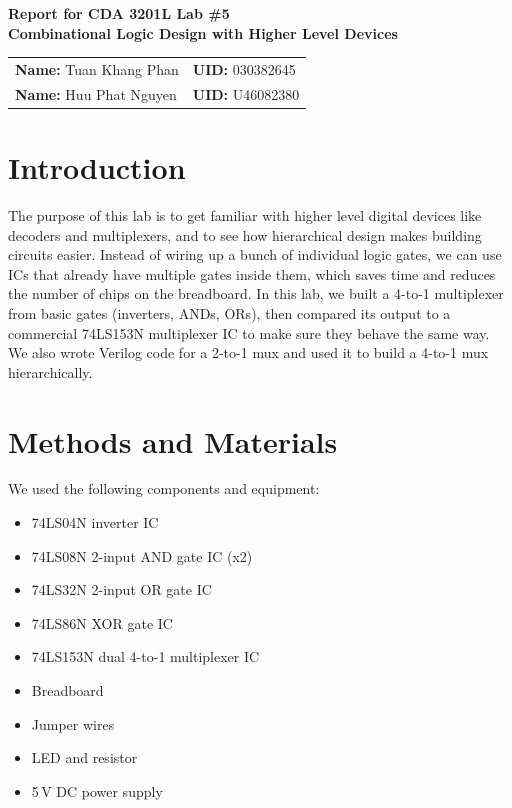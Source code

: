 \documentclass[12pt, letterpaper]{article}
\begin{document}
\begin{center}
  {\large \textbf{Report for CDA 3201L Lab \#5}}\\[2pt]
  {\large \textbf{Combinational Logic Design with Higher Level Devices}}\\[8pt]
  \begin{tabular}{ll}
    \textbf{Name:} Tuan Khang Phan & \textbf{UID:} 030382645 \\
    \textbf{Name:} Huu Phat Nguyen & \textbf{UID:} U46082380 \\
  \end{tabular}
\end{center}

\section{Introduction}

The purpose of this lab is to get familiar with higher level digital devices like decoders and multiplexers, and to see how hierarchical design makes building circuits easier. Instead of wiring up a bunch of individual logic gates, we can use ICs that already have multiple gates inside them, which saves time and reduces the number of chips on the breadboard. In this lab, we built a 4-to-1 multiplexer from basic gates (inverters, ANDs, ORs), then compared its output to a commercial 74LS153N multiplexer IC to make sure they behave the same way. We also wrote Verilog code for a 2-to-1 mux and used it to build a 4-to-1 mux hierarchically.

\section{Methods and Materials}

We used the following components and equipment:

\begin{itemize}
  \item 74LS04N inverter IC
  \item 74LS08N 2-input AND gate IC (x2)
  \item 74LS32N 2-input OR gate IC
  \item 74LS86N XOR gate IC
  \item 74LS153N dual 4-to-1 multiplexer IC
  \item Breadboard
  \item Jumper wires
  \item LED and resistor
  \item 5\,V DC power supply
\end{itemize}
\end{document}
